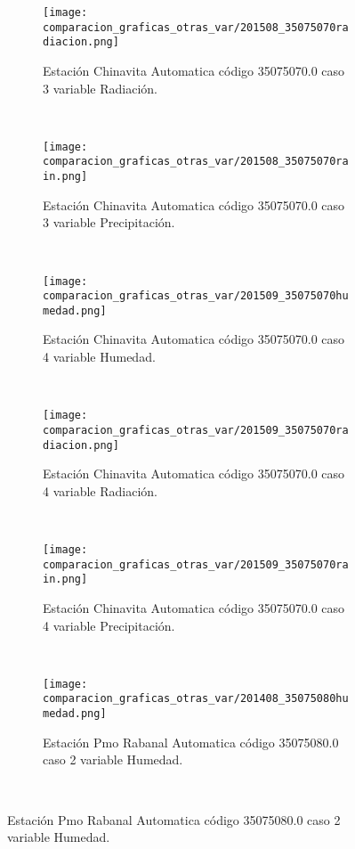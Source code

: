 \begin{figure}[H]
\centering
\begin{subfigure}[normla]{0.4\textwidth}
\caption{Estación Chinavita Automatica código 35075070.0 caso 3 variable Radiación.}
\texttt{[image: comparacion\_graficas\_otras\_var/201508\_35075070radiacion.png]}
\end{subfigure}
~
\begin{subfigure}[normla]{0.4\textwidth}
\caption{Estación Chinavita Automatica código 35075070.0 caso 3 variable Precipitación.}
\texttt{[image: comparacion\_graficas\_otras\_var/201508\_35075070rain.png]}
\end{subfigure}
~
\begin{subfigure}[normla]{0.4\textwidth}
\caption{Estación Chinavita Automatica código 35075070.0 caso 4 variable Humedad.}
\texttt{[image: comparacion\_graficas\_otras\_var/201509\_35075070humedad.png]}
\end{subfigure}
~
\begin{subfigure}[normla]{0.4\textwidth}
\caption{Estación Chinavita Automatica código 35075070.0 caso 4 variable Radiación.}
\texttt{[image: comparacion\_graficas\_otras\_var/201509\_35075070radiacion.png]}
\end{subfigure}
~
\begin{subfigure}[normla]{0.4\textwidth}
\caption{Estación Chinavita Automatica código 35075070.0 caso 4 variable Precipitación.}
\texttt{[image: comparacion\_graficas\_otras\_var/201509\_35075070rain.png]}
\end{subfigure}
~
\begin{subfigure}[normla]{0.4\textwidth}
\caption{Estación Pmo Rabanal Automatica  código 35075080.0 caso 2 variable Humedad.}
\texttt{[image: comparacion\_graficas\_otras\_var/201408\_35075080humedad.png]}
\end{subfigure}
~
\end{figure}
           
